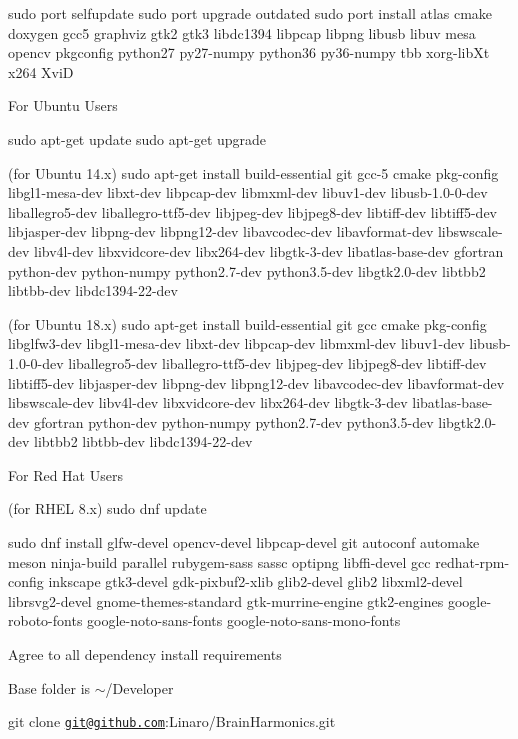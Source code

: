 \begin{DoxyCode}
sudo port selfupdate
sudo port upgrade outdated
sudo port install atlas cmake doxygen gcc5 graphviz gtk2 gtk3 libdc1394 libpcap libpng libusb libuv mesa
       opencv pkgconfig python27 py27-numpy python36 py36-numpy tbb xorg-libXt x264 XviD
\end{DoxyCode}
 For Ubuntu Users 
\begin{DoxyCode}
sudo apt-get update
sudo apt-get upgrade

(for Ubuntu 14.x)
sudo apt-get install build-essential git gcc-5 cmake pkg-config libgl1-mesa-dev libxt-dev libpcap-dev
       libmxml-dev libuv1-dev libusb-1.0-0-dev liballegro5-dev liballegro-ttf5-dev libjpeg-dev libjpeg8-dev libtiff-dev
       libtiff5-dev libjasper-dev libpng-dev libpng12-dev libavcodec-dev libavformat-dev libswscale-dev libv4l-dev
       libxvidcore-dev libx264-dev libgtk-3-dev libatlas-base-dev gfortran python-dev python-numpy python2.7-dev
       python3.5-dev libgtk2.0-dev libtbb2 libtbb-dev libdc1394-22-dev

(for Ubuntu 18.x)
sudo apt-get install build-essential git gcc cmake pkg-config libglfw3-dev libgl1-mesa-dev libxt-dev
       libpcap-dev libmxml-dev libuv1-dev libusb-1.0-0-dev liballegro5-dev liballegro-ttf5-dev libjpeg-dev libjpeg8-dev
       libtiff-dev libtiff5-dev libjasper-dev libpng-dev libpng12-dev libavcodec-dev libavformat-dev libswscale-dev
       libv4l-dev libxvidcore-dev libx264-dev libgtk-3-dev libatlas-base-dev gfortran python-dev python-numpy
       python2.7-dev python3.5-dev libgtk2.0-dev libtbb2 libtbb-dev libdc1394-22-dev
\end{DoxyCode}
 For Red Hat Users 
\begin{DoxyCode}
(for RHEL 8.x)
sudo dnf update

sudo dnf install glfw-devel opencv-devel libpcap-devel git autoconf automake meson ninja-build parallel
       rubygem-sass sassc optipng libffi-devel gcc redhat-rpm-config inkscape gtk3-devel gdk-pixbuf2-xlib glib2-devel
       glib2 libxml2-devel librsvg2-devel gnome-themes-standard gtk-murrine-engine gtk2-engines google-roboto-fonts
       google-noto-sans-fonts google-noto-sans-mono-fonts
\end{DoxyCode}


Agree to all dependency install requirements

Base folder is $\sim$/\+Developer

git clone \href{mailto:git@github.com}{\tt git@github.\+com}\+:Linaro/\+Brain\+Harmonics.\+git

